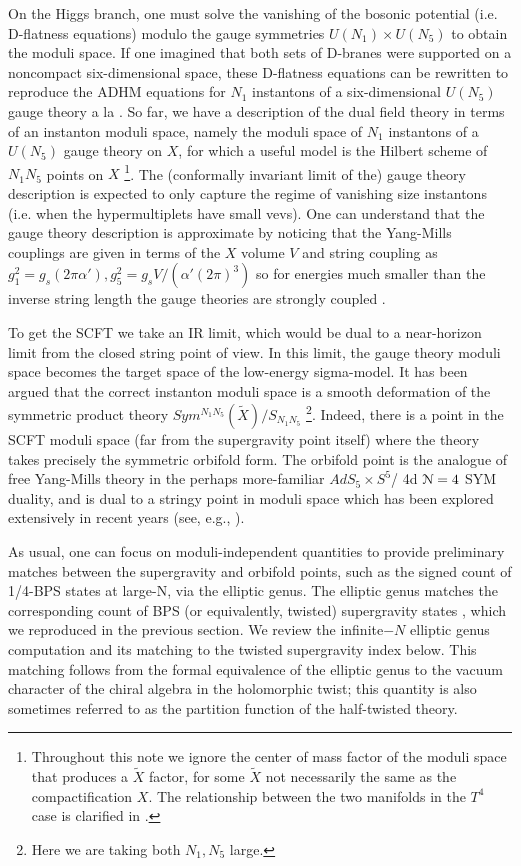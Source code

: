 \documentclass[../main.tex]{subfiles}
\begin{document}
On the Higgs branch, one must solve the vanishing of the bosonic potential (i.e. D-flatness equations) modulo the gauge symmetries $U(N_1)\times U(N_5)$ to obtain the moduli space. 
If one imagined that both sets of D-branes were supported on a noncompact six-dimensional space, these D-flatness equations can be rewritten to reproduce the ADHM equations for $N_1$ instantons of a six-dimensional $U(N_5)$ gauge theory a la \cite{WittenADHM}. So far, we have a description of the dual field theory in terms of an instanton moduli space, namely the moduli space of $N_1$ instantons of a $U(N_5)$ gauge theory on $X$, for which a useful model is the Hilbert scheme of $N_1 N_5$ points on $X$ \footnote{Throughout this note we ignore the center of mass factor of the moduli space that produces a $\tilde{X}$ factor, for some $\tilde{X}$ not necessarily the same as the compactification $X$. The relationship between the two manifolds in the $T^4$ case is clarified in \cite{GiveonKutasovSeiberg}.}. The (conformally invariant limit of the) gauge theory description is expected to only capture the regime of vanishing size instantons (i.e. when the hypermultiplets have small vevs). One can understand that the gauge theory description is approximate by noticing that the Yang-Mills couplings are given in terms of the $X$ volume $V$ and string coupling as $g_1^2 = g_s (2 \pi \alpha'), g_5^2 = g_s V/(\alpha' (2\pi)^3)$ so for energies much smaller than the inverse string length the gauge theories are strongly coupled \cite{Davidetal}. 


To get the SCFT we take an IR limit, which would be dual to a near-horizon limit from the closed string point of view. In this limit, the gauge theory moduli space becomes the target space of the low-energy sigma-model. It has been argued that the correct instanton moduli space is a smooth deformation of the symmetric product theory $Sym^{N_1 N_5}(\tilde{X})/S_{N_1 N_5}$ \footnote{Here we are taking both $N_1, N_5$ large.}. Indeed, there is a point in the SCFT moduli space (far from the supergravity point itself) where the theory takes precisely the symmetric orbifold form. The orbifold point is the analogue of free Yang-Mills theory in the perhaps more-familiar $AdS_5\times S^5$/ 4d $\mathcal N =4$ SYM duality, and is dual to a stringy point in moduli space which has been explored extensively in recent years (see, e.g., \cite{Eberhardt:2021vsx, Eberhardt:2019ywk, Eberhardt:2018ouy}).

As usual, one can focus on moduli-independent quantities to provide preliminary matches between the supergravity and orbifold points, such as the signed count of 1/4-BPS states at large-N, via the elliptic genus. The elliptic genus matches the corresponding count of BPS (or equivalently, twisted) supergravity states \cite{deBoerEG}, which we reproduced in the previous section. We review the infinite$-N$ elliptic genus computation and its matching to the twisted supergravity index below. This matching follows from the formal equivalence of the elliptic genus to the vacuum character of the chiral algebra in the holomorphic twist; this quantity is also sometimes referred to as the partition function of the half-twisted theory. 
\end{document}
